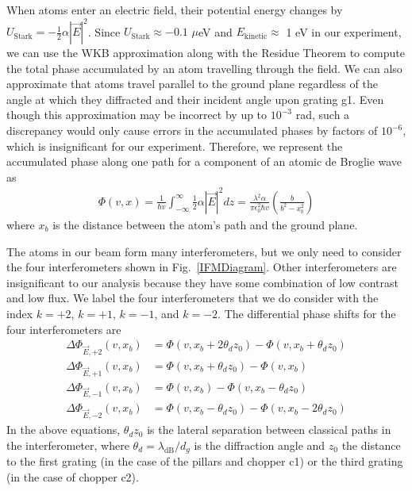 \documentclass[twocolumn,pra,showpacs,superscriptaddress,longbibliography]{revtex4-1}   %
\newcommand{\figref}[1]{Fig.~\ref{#1}}
\begin{document}
When atoms enter an electric field, their potential energy changes by $U_{\mathrm{Stark}} = -\frac{1}{2}\alpha|\vec{E}|^2$.
Since $U_{\mathrm{Stark}} \approx -0.1$ $\mu$eV and $E_{\mathrm{kinetic}} \approx$ 1 eV in our experiment, we can use the WKB approximation along with the Residue Theorem to compute the total phase accumulated by an atom travelling through the field.
We can also approximate that atoms travel parallel to the ground plane regardless of the angle at which they diffracted and their incident angle upon grating g1. Even though this approximation may be incorrect by up to $10^{-3}$ rad, such a discrepancy would only cause errors in the accumulated phases by factors of $10^{-6}$, which is insignificant for our experiment.
Therefore, we represent the accumulated phase along one path for a component of an atomic de Broglie wave as
\begin{align}
	\Phi(v,x) = 
	\frac{1}{\hbar v} \int_{-\infty}^{\infty} \frac{1}{2} \alpha |\vec{E}|^2 dz =	
	\frac{\lambda^2 \alpha}{\pi \epsilon_0^2 \hbar v}
	\left( \frac{b}{b^2-x_b^2} \right)
	\label{accumPhasePillars}
\end{align}
where $x_b$ is the distance between the atom's path and the ground plane.

The atoms in our beam form many interferometers, but we only need to consider the four interferometers shown in \figref{IFMDiagram}. 
Other interferometers are insignificant to our analysis because they have some combination of low contrast and low flux.
We label the four interferometers that we do consider with the index $k=+2$, $k=+1$, $k=-1$, and $k=-2$. 
The differential phase shifts for the four interferometers are
\begin{align}
	\Delta\Phi_{\vec{E},+2}(v,x_b) &= \Phi(v, x_b+2\theta_d z_0) - \Phi(v, x_b+\theta_d z_0) \nonumber \\
	\Delta\Phi_{\vec{E},+1}(v,x_b) &= \Phi(v, x_b+\theta_d z_0) - \Phi(v, x_b) \nonumber \\
	\Delta\Phi_{\vec{E},-1}(v,x_b) &= \Phi(v, x_b) - \Phi(v, x_b-\theta_d z_0) \nonumber \\
	\Delta\Phi_{\vec{E},-2}(v,x_b) &= \Phi(v, x_b-\theta_d z_0) - \Phi(v, x_b-2\theta_d z_0)
	\label{deltaPhasePillars}
\end{align}
In the above equations, $\theta_d z_0$ is the lateral separation between classical paths in the interferometer, where $\theta_d = \lambda_{\mathrm{dB}} / d_g$ is the diffraction angle and $z_0$ the distance to 
the first grating (in the case of the pillars and chopper c1) or the third grating (in the case of chopper c2).
\end{document}
